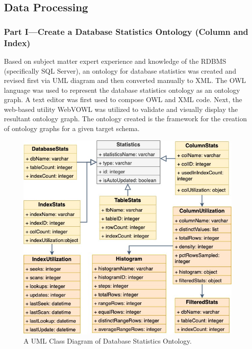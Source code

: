 \documentclass[sigconf]{acmart}
\begin{document}
\subsection{Data Processing}

\subsubsection{Part I—Create a Database Statistics Ontology (Column and Index)}
Based on subject matter expert experience and knowledge of the RDBMS (specifically
SQL Server), an ontology for database statistics was created and revised first via UML diagram and then converted manually to XML. The OWL language was used to represent the database statistics ontology as an ontology graph. A text editor was first used to compose OWL and XML code. Next, the web-based utility WebVOWL was utilized to validate and visually display the resultant ontology graph. The ontology created is the framework for the creation of ontology graphs for a given target schema. 

\begin{figure}[h]
	\centering
	\includegraphics[width=\linewidth]{uml-db-statistic}
	\caption{A UML Class Diagram of Database Statistics Ontology.}
	\label{statistics-class-diagram}
\end{figure}
\end{document}
